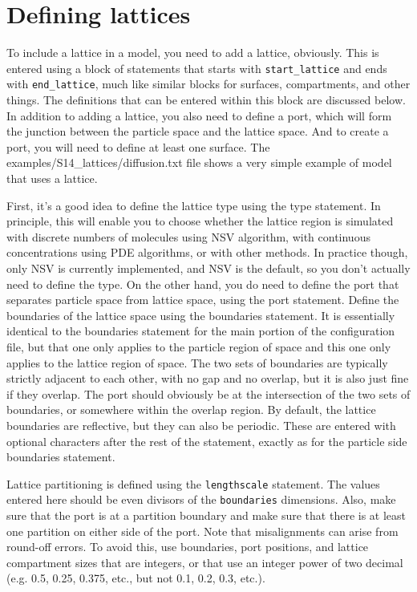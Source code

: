 \documentclass {book}
\newcommand {\ttt} {\texttt}
\begin{document}
\section{Defining lattices}

To include a lattice in a model, you need to add a lattice, obviously. This is entered using a block of statements that starts with \ttt{start\_lattice} and ends with \ttt{end\_lattice}, much like similar blocks for surfaces, compartments, and other things. The definitions that can be entered within this block are discussed below. In addition to adding a lattice, you also need to define a port, which will form the junction between the particle space and the lattice space. And to create a port, you will need to define at least one surface. The examples/S14\_lattices/diffusion.txt file shows a very simple example of model that uses a lattice.

First, it's a good idea to define the lattice type using the type statement. In principle, this will enable you to choose whether the lattice region is simulated with discrete numbers of molecules using NSV algorithm, with continuous concentrations using PDE algorithms, or with other methods. In practice though, only NSV is currently implemented, and NSV is the default, so you don't actually need to define the type. On the other hand, you do need to define the port that separates particle space from lattice space, using the port statement.
Define the boundaries of the lattice space using the boundaries statement. It is essentially identical to the boundaries statement for the main portion of the configuration file, but that one only applies to the particle region of space and this one only applies to the lattice region of space. The two sets of boundaries are typically strictly adjacent to each other, with no gap and no overlap, but it is also just fine if they overlap. The port should obviously be at the intersection of the two sets of boundaries, or somewhere within the overlap region. By default, the lattice boundaries are reflective, but they can also be periodic. These are entered with optional characters after the rest of the statement, exactly as for the particle side boundaries statement.

Lattice partitioning is defined using the \ttt{lengthscale} statement. The values entered here should be even divisors of the \ttt{boundaries} dimensions. Also, make sure that the port is at a partition boundary and make sure that there is at least one partition on either side of the port. Note that misalignments can arise from round-off errors. To avoid this, use boundaries, port positions, and lattice compartment sizes that are integers, or that use an integer power of two decimal (e.g. 0.5, 0.25, 0.375, etc., but not 0.1, 0.2, 0.3, etc.).
\end{document}
